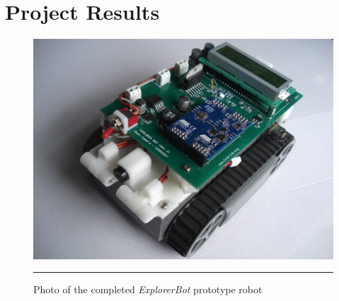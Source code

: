 \chapter{Project Results}
\label{Chapter 6}


\begin{figure}[H]
	\vspace{1em}
	\centering
		\includegraphics[width=140mm]{./Figures/CompletedRobot.jpg}
	\rule{35em}{0.5pt}
	\caption[Photo of Completed Robot]{Photo of the completed \textit{ExplorerBot} prototype robot}
	\label{fig:completedrobot}
\end{figure}